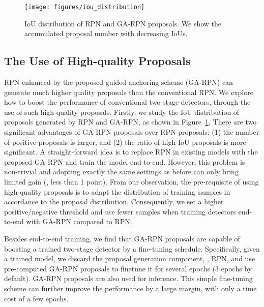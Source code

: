 \documentclass[10pt,twocolumn,letterpaper]{article}
\begin{document}
\begin{figure}[t]
	\centering
	\texttt{[image: figures/iou\_distribution]}
	\caption{\small{IoU distribution of RPN and GA-RPN proposals. We show the
		accumulated proposal number with decreasing IoUs.}}
	\label{fig:iou-distribution}
	\vspace{-15pt}
\end{figure}

\subsection{The Use of High-quality Proposals}
RPN enhanced by the proposed guided anchoring scheme (GA-RPN) can generate much higher quality proposals than the conventional RPN.
We explore how to boost the performance of conventional two-stage detectors, through the use of such high-quality proposals.
Firstly, we study the IoU distribution of proposals generated by RPN and GA-RPN, as shown in Figure~\ref{fig:iou-distribution}.
There are two significant advantages of GA-RPN proposals over RPN proposals:
(1) the number of positive proposals is larger, and (2) the ratio of high-IoU
proposals is more significant.
A straight-forward idea is to replace RPN in existing models with the proposed GA-RPN
and train the model end-to-end.
However, this problem is non-trivial and adopting exactly the same settings as before can only bring limited gain (\eg, less than 1 point).
From our observation, the pre-requisite of using high-quality proposals is to adapt the distribution of training
samples in accordance to the proposal distribution. Consequently, we set a higher positive/negative threshold and use fewer samples when training
detectors end-to-end with GA-RPN compared to RPN.

Besides end-to-end training, we find that GA-RPN proposals are capable of boosting a trained
two-stage detector by a fine-tuning schedule. Specifically, given a trained model, we discard the proposal generation component, \eg, RPN, and use pre-computed GA-RPN proposals to finetune it for several epochs (3 epochs by default).
GA-RPN proposals are also used for inference.
This simple fine-tuning scheme can further improve the performance by a large margin,
with only a time cost of a few epochs.
 
\end{document}
